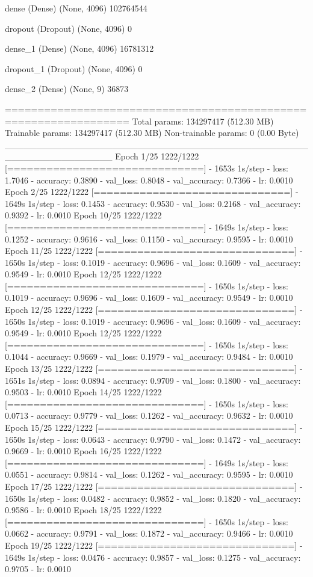 \documentclass[11pt, a4paper]{article} %
\begin{document}
 dense (Dense)               (None, 4096)              102764544 
                                                                 
 dropout (Dropout)           (None, 4096)              0         
                                                                 
 dense_1 (Dense)             (None, 4096)              16781312  
                                                                 
 dropout_1 (Dropout)         (None, 4096)              0         
                                                                 
 dense_2 (Dense)             (None, 9)                 36873     
                                                                 
=================================================================
Total params: 134297417 (512.30 MB)
Trainable params: 134297417 (512.30 MB)
Non-trainable params: 0 (0.00 Byte)
_________________________________________________________________
Epoch 1/25
1222/1222 [==============================] - 1653s 1s/step - loss: 1.7046 - accuracy: 0.3890 - val_loss: 0.8048 - val_accuracy: 0.7366 - lr: 0.0010
Epoch 2/25
1222/1222 [==============================] - 1649s 1s/step - loss: 0.1453 - accuracy: 0.9530 - val_loss: 0.2168 - val_accuracy: 0.9392 - lr: 0.0010
Epoch 10/25
1222/1222 [==============================] - 1649s 1s/step - loss: 0.1252 - accuracy: 0.9616 - val_loss: 0.1150 - val_accuracy: 0.9595 - lr: 0.0010
Epoch 11/25
1222/1222 [==============================] - 1650s 1s/step - loss: 0.1019 - accuracy: 0.9696 - val_loss: 0.1609 - val_accuracy: 0.9549 - lr: 0.0010
Epoch 12/25
1222/1222 [==============================] - 1650s 1s/step - loss: 0.1019 - accuracy: 0.9696 - val_loss: 0.1609 - val_accuracy: 0.9549 - lr: 0.0010
Epoch 12/25
1222/1222 [==============================] - 1650s 1s/step - loss: 0.1019 - accuracy: 0.9696 - val_loss: 0.1609 - val_accuracy: 0.9549 - lr: 0.0010
Epoch 12/25
1222/1222 [==============================] - 1650s 1s/step - loss: 0.1044 - accuracy: 0.9669 - val_loss: 0.1979 - val_accuracy: 0.9484 - lr: 0.0010
Epoch 13/25
1222/1222 [==============================] - 1651s 1s/step - loss: 0.0894 - accuracy: 0.9709 - val_loss: 0.1800 - val_accuracy: 0.9503 - lr: 0.0010
Epoch 14/25
1222/1222 [==============================] - 1650s 1s/step - loss: 0.0713 - accuracy: 0.9779 - val_loss: 0.1262 - val_accuracy: 0.9632 - lr: 0.0010
Epoch 15/25
1222/1222 [==============================] - 1650s 1s/step - loss: 0.0643 - accuracy: 0.9790 - val_loss: 0.1472 - val_accuracy: 0.9669 - lr: 0.0010
Epoch 16/25
1222/1222 [==============================] - 1649s 1s/step - loss: 0.0551 - accuracy: 0.9814 - val_loss: 0.1262 - val_accuracy: 0.9595 - lr: 0.0010
Epoch 17/25
1222/1222 [==============================] - 1650s 1s/step - loss: 0.0482 - accuracy: 0.9852 - val_loss: 0.1820 - val_accuracy: 0.9586 - lr: 0.0010
Epoch 18/25
1222/1222 [==============================] - 1650s 1s/step - loss: 0.0662 - accuracy: 0.9791 - val_loss: 0.1872 - val_accuracy: 0.9466 - lr: 0.0010
Epoch 19/25
1222/1222 [==============================] - 1649s 1s/step - loss: 0.0476 - accuracy: 0.9857 - val_loss: 0.1275 - val_accuracy: 0.9705 - lr: 0.0010
\end{document}
